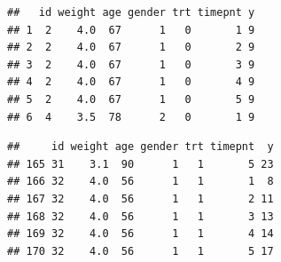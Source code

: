 \documentclass[
]{book}
\begin{document}
\begin{verbatim}
##   id weight age gender trt timepnt y
## 1  2    4.0  67      1   0       1 9
## 2  2    4.0  67      1   0       2 9
## 3  2    4.0  67      1   0       3 9
## 4  2    4.0  67      1   0       4 9
## 5  2    4.0  67      1   0       5 9
## 6  4    3.5  78      2   0       1 9
\end{verbatim}

\begin{verbatim}
##     id weight age gender trt timepnt  y
## 165 31    3.1  90      1   1       5 23
## 166 32    4.0  56      1   1       1  8
## 167 32    4.0  56      1   1       2 11
## 168 32    4.0  56      1   1       3 13
## 169 32    4.0  56      1   1       4 14
## 170 32    4.0  56      1   1       5 17
\end{verbatim}
\end{document}
